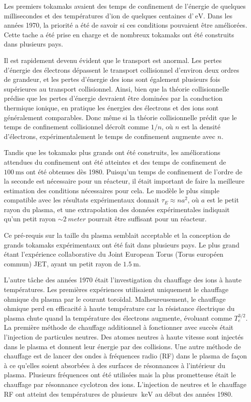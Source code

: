 \documentclass[main.tex]{subfiles}
\begin{document}
Les premiers tokamaks avaient des temps de confinement de l'énergie de quelques millisecondes et des températures d'ion de quelques centaines d'\( \SI{}{\electronvolt} \).
Dans les années 1970, la priorité a été de savoir si ces conditions pouvaient être améliorées.
Cette tache a été prise en charge et de nombreux tokamaks ont été construits dans plusieurs pays.

Il est rapidement devenu évident que le transport est anormal.
Les pertes d’énergie des électrons dépassent le transport collisionnel d’environ deux ordres de grandeur, et les pertes d’énergie des ions sont également plusieurs fois supérieures au transport collisionnel.
Ainsi, bien que la théorie collisionnelle prédise que les pertes d’énergie devraient être dominées par la conduction thermique ionique, en pratique les énergies des électrons et des ions sont généralement comparables.
Donc même si la théorie collisionnelle prédit que le temps de confinement collisionnel décroît comme \( 1/n \), où \( n \) est la densité d'électrons, expérimentalement le temps de confinement augmente avec \( n \).

Tandis que les tokamaks plus grands ont été construits, les améliorations attendues du confinement ont été atteintes et des temps de confinement de \( \SI{100}{\milli\second} \) ont été obtenues dès 1980.
Puisqu'un temps de confinement de l'ordre de la seconde est nécessaire pour un réacteur, il était important de faire la meilleure estimation des conditions nécessaires pour cela.
Le modèle le plus simple compatible avec les résultats expérimentaux donnait \( \tau_E \approx n a^2 \), où \( a \) est le petit rayon du plasma, et une extrapolation des données expérimentales indiquait qu'un petit rayon \( \sim \SI{2}{meter} \) pourrait être suffisant pour un réacteur.

Ce pré-requis sur la taille du plasma semblait acceptable et la conception de grands tokamaks expérimentaux ont été fait dans plusieurs pays.
Le plus grand étant l'expérience collaborative du Joint European Torus (Torus européen commun) JET, ayant un petit rayon de \( \SI{1.5}{\meter} \).

L'autre tâche des années 1970 était l'investigation du chauffage des ions à haute températures.
Les premières expériences utilisaient uniquement le chauffage ohmique du plasma par le courant toroïdal.
Malheureusement, le chauffage ohmique perd en efficacité à haute température car la résistance électrique du plasma chute quand la température des électrons augmente, évoluant comme \( T_e^{3/2} \).
La première méthode de chauffage additionnel à fonctionner avec succès était l'injection de particules neutres.
Des atomes neutres à haute vitesse sont injectés dans le plasma et donnent leur énergie par des collisions.
Une autre méthode de chauffage est de lancer des ondes à fréquences radio (RF) dans le plasma de façon à ce qu'elles soient absorbées à des surfaces de résonnances à l'intérieur du plasma.
Plusieurs fréquences ont été utilisées mais la plus prometteuse était le chauffage par résonnance cyclotron des ions.
L'injection de neutres et le chauffage RF ont atteint des températures de plusieurs \( \SI{}{\kilo\electronvolt} \) au début des années 1980.
\end{document}
